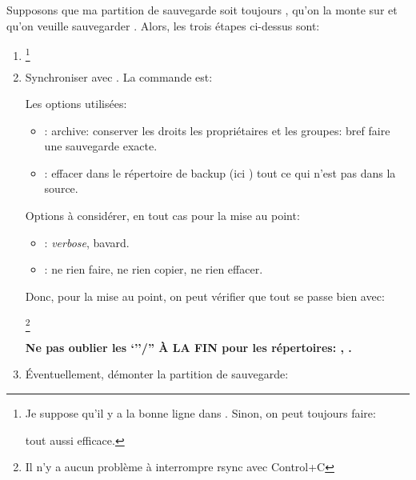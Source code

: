 Supposons que ma partition de sauvegarde soit toujours
, qu'on la monte sur  et qu'on veuille
  sauvegarder . Alors, les trois étapes ci-dessus sont:
\begin{enumerate}
  \item {}\footnote{Je suppose qu'il y a la bonne ligne
    dans .  Sinon, on peut toujours faire:


    tout aussi efficace.
  }
    
  \item Synchroniser avec .  La commande est:


    Les options utilisées:

    \begin{itemize}
      \item {}: \og archive\fg{}: conserver les droits  les
        propriétaires et les groupes: bref faire une sauvegarde
        exacte.
      \item {}: effacer dans le répertoire de backup (ici
        ) tout ce qui n'est pas dans la source.
    \end{itemize}

    Options à considérer, en tout cas pour la mise au point:

     \begin{itemize}
     \item {}: \emph{verbose}, bavard.
     \item {}: ne rien faire, ne rien copier, ne rien
       effacer.
     \end{itemize}

     Donc, pour la mise au point, on peut vérifier que tout se passe
     bien avec:

     \footnote{Il n'y a 
       aucun problème à interrompre rsync avec Control+C}

     \textdbend\textdbend

     \textbf{Ne pas oublier les `''/'' \`A LA FIN pour les
       répertoires:  , .}

     \textdbend\textdbend
       
     
  \item Éventuellement, démonter la partition de sauvegarde:

\end{enumerate}

